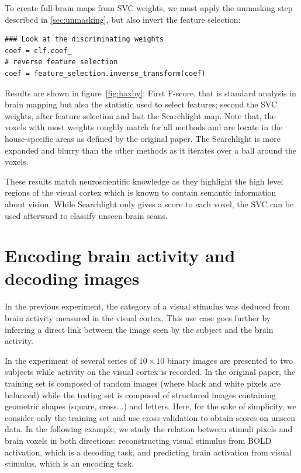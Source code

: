 \documentclass{frontiersSCNS} %
\begin{document}
To create full-brain maps from SVC weights, we must apply the
unmasking step described in \ref{sec:unmasking}, but also invert the
feature selection:
\begin{lstlisting}
### Look at the discriminating weights
coef = clf.coef_
# reverse feature selection
coef = feature_selection.inverse_transform(coef)
\end{lstlisting}

Results are shown in figure~\ref{fig:haxby}: First
F-score, that is standard analysis in brain mapping but also the
statistic used to select features; second the SVC weights, after feature
selection and last the Searchlight map.
%
Note that, the voxels with most weights roughly match for all methods and
are locate in the house-specific areas as defined by the original paper.
The Searchlight is more expanded and blurry than the other methods
as it iterates over a ball around the voxels.

These results match neuroscientific knowledge as they highlight the
high level regions of the visual cortex which is known to contain semantic
information about vision. While Searchlight only gives a score to each voxel,
the SVC can be used afterward to classify unseen brain scans.

\section{Encoding brain activity and decoding images}
\label{kamitani}

In the previous experiment, the category of a visual stimulus was deduced from
brain activity measured in the visual cortex.
This use case goes further by inferring a direct link between the image
seen by the subject and the brain activity.

In the experiment of \cite{miyawaki2008} several series of $10{\times}10$
binary images are presented to two subjects while activity on the visual cortex
is recorded.
In the original paper, the training set is composed of random images (where black and white pixels
are balanced) while the testing set is composed of structured images containing
geometric shapes (square, cross...) and letters. Here, for the sake of simplicity, we consider only the training set and use cross-validation to
obtain scores on unseen data.
%
In the following example, we study the relation between stimuli pixels and
brain voxels in both directions: reconstructing visual stimulus from BOLD activation,
which is a decoding task, and predicting brain activation from visual
stimulus, which is an encoding task.
\end{document}
